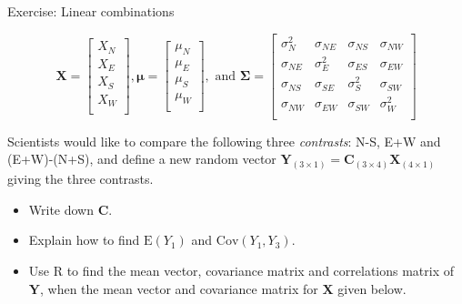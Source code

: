 \documentclass[ignorenonframetext,]{beamer}
\providecommand{\tightlist}{%
  \setlength{\itemsep}{0pt}\setlength{\parskip}{0pt}}
\begin{document}
\begin{frame}

\begin{block}{Exercise: Linear combinations}

\[\boldsymbol{X}=\left[ \begin{array}{c} X_N\\
          X_E\\
X_S\\
          X_W\\
          \end{array}
          \right],
          \boldsymbol{\mu}=\left[
      \begin{array}{c} \mu_N\\
          \mu_E\\
\mu_S\\
          \mu_W\\
          \end{array}
          \right], \text{ and } \boldsymbol\Sigma=\left[ \begin{array}{cccc}
    \sigma_{N}^2 & \sigma_{NE} & \sigma_{NS} & \sigma_{NW}\\
    \sigma_{NE} & \sigma_{E}^2 & \sigma_{ES}& \sigma_{EW}\\
        \sigma_{NS} & \sigma_{SE} & \sigma_{S}^2 & \sigma_{SW}\\
    \sigma_{NW} & \sigma_{EW} & \sigma_{SW} & \sigma_{W}^2\\
\end{array} \right]\]

Scientists would like to compare the following three \emph{contrasts}:
N-S, E+W and (E+W)-(N+S), and define a new random vector
\(\boldsymbol{Y}_{(3\times 1)}=\boldsymbol{C}_{(3\times 4)} \boldsymbol{X}_{(4\times 1)}\)
giving the three contrasts.

\vspace{2mm}

\begin{itemize}
\tightlist
\item
  Write down \(\boldsymbol{C}\).
\item
  Explain how to find \(\text{E}(Y_1)\) and \(\text{Cov}(Y_1,Y_3)\).
\item
  Use R to find the mean vector, covariance matrix and correlations
  matrix of \(\boldsymbol{Y}\), when the mean vector and covariance
  matrix for \(\boldsymbol{X}\) given below.
\end{itemize}

\end{block}

\end{frame}
\end{document}
